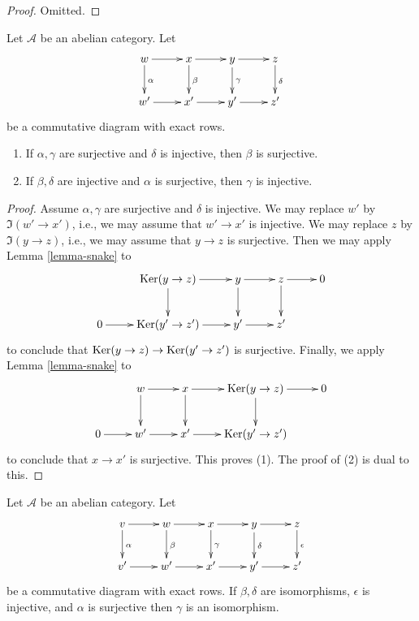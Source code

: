 \begin{proof}
Omitted.
\end{proof}

\begin{lemma}
\label{lemma-four-lemma}
Let $\mathcal{A}$ be an abelian category. Let
$$
\xymatrix{
w \ar[r] \ar[d]^\alpha & x \ar[r]
\ar[d]^\beta & y \ar[r] \ar[d]^\gamma &
z \ar[d]^\delta \\
w' \ar[r] & x' \ar[r] & y' \ar[r] & z'
}
$$
be a commutative diagram with exact rows.
\begin{enumerate}
\item If $\alpha, \gamma$ are surjective and
$\delta$ is injective, then
$\beta$ is surjective.
\item If $\beta, \delta$ are injective and
$\alpha$ is surjective, then
$\gamma$ is injective.
\end{enumerate}
\end{lemma}

\begin{proof}
Assume $\alpha, \gamma$ are surjective and
$\delta$ is injective.
We may replace $w'$ by $\Im(w' \to x')$,
i.e., we may assume
that $w' \to x'$ is injective.
We may replace $z$ by $\Im(y \to z)$, i.e.,
we may assume that
$y \to z$ is surjective. Then we may apply
Lemma \ref{lemma-snake}
to
$$
\xymatrix{
& \Ker(y \to z) \ar[r] \ar[d] & y \ar[r]
\ar[d] & z \ar[r] \ar[d] & 0 \\
0 \ar[r] & \Ker(y' \to z') \ar[r] & y' \ar[r]
& z'
}
$$
to conclude that $\mathop{\mathrm{Ker}}(y \to z) \to \mathop{\mathrm{Ker}}(y'
\to z')$ is
surjective. Finally, we apply
Lemma \ref{lemma-snake}
to
$$
\xymatrix{
& w \ar[r] \ar[d] & x \ar[r] \ar[d] & \Ker(y
\to z) \ar[r] \ar[d] & 0 \\
0 \ar[r] & w' \ar[r] & x' \ar[r] & \Ker(y'
\to z')
}
$$
to conclude that $x \to x'$ is surjective.
This proves (1). The proof
of (2) is dual to this.
\end{proof}

\begin{lemma}
\label{lemma-five-lemma}
\begin{reference}
\cite[Lemma 4.5 page 16]{Eilenberg-Steenrod}
\end{reference}
Let $\mathcal{A}$ be an abelian category. Let
$$
\xymatrix{
v \ar[r] \ar[d]^\alpha &
w \ar[r] \ar[d]^\beta &
x \ar[r] \ar[d]^\gamma &
y \ar[r] \ar[d]^\delta &
z \ar[d]^\epsilon \\
v' \ar[r] & w' \ar[r] & x' \ar[r] & y' \ar[r]
& z'
}
$$
be a commutative diagram with exact rows. If
$\beta, \delta$
are isomorphisms, $\epsilon$ is injective,
and $\alpha$ is surjective
then $\gamma$ is an isomorphism.
\end{lemma}

